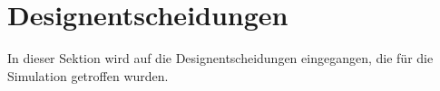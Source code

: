 %


\section{Designentscheidungen}\label{sec:projectarchitecture}

In dieser Sektion wird auf die Designentscheidungen eingegangen, die für die Simulation getroffen wurden.




